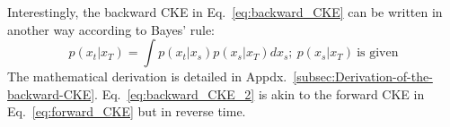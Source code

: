 Interestingly, the backward CKE in Eq.~\ref{eq:backward_CKE} can
be written in another way according to Bayes' rule:
\begin{equation}
p\left(x_{t}|x_{T}\right)=\int p\left(x_{t}|x_{s}\right)p\left(x_{s}|x_{T}\right)dx_{s};\ p\left(x_{s}|x_{T}\right)\ \text{is given}\label{eq:backward_CKE_2}
\end{equation}
The mathematical derivation is detailed in Appdx.~\ref{subsec:Derivation-of-the-backward-CKE}.
Eq.~\ref{eq:backward_CKE_2} is akin to the forward CKE in Eq.~\ref{eq:forward_CKE}
but in reverse time.
